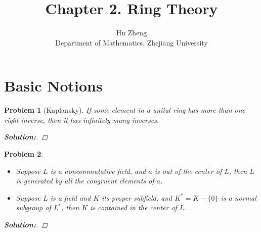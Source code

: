 \documentclass[11pt]{article}
\title{Chapter 2. Ring Theory}
\author{Hu Zheng \\ Department of Mathematics, Zhejiang University}
\newtheorem{problem}{Problem}
\numberwithin{problem}{section}
\newenvironment{solution}
               {\let\oldqedsymbol=\qedsymbol
                \renewcommand{\qedsymbol}{$\blacktriangleleft$}
                \begin{proof}[\bfseries\upshape Solution:]}
               {\end{proof}
                \renewcommand{\qedsymbol}{\oldqedsymbol}}
\begin{document}
\maketitle

\section{Basic Notions}

\begin{problem}[Kaplansky]
If some element in a unital ring has more than one right inverse, then it has infinitely many inverses.
\begin{solution}

\end{solution}
\end{problem}

\begin{problem}
\begin{itemize}


\item[(1)] Suppose $L$ is a noncommutative field, and $a$ is out of the center of $L$, then $L$ is generated by all the congruent elements of $a$.
\item[(2)] Suppose $L$ is a field and $K$ its proper subfield, and $K^*=K-\{0\}$ is a normal subgroup of $L^*$, then $K$ is contained in the center of $L$.
\end{itemize}
\begin{solution}

\end{solution}

\end{problem}
\end{document}
